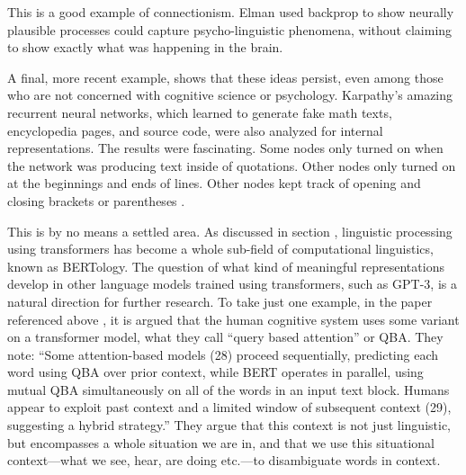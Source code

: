 This is a good example of connectionism. Elman used backprop to show neurally plausible processes could capture psycho-linguistic phenomena, without claiming to show exactly what was happening in the brain.

A final, more recent example, shows that these ideas persist, even among those who are not concerned with cognitive science or psychology. Karpathy's amazing recurrent neural networks, which learned to generate fake math texts, encyclopedia pages, and source code, were also analyzed for internal representations. The results were fascinating. Some nodes only turned on when the network was producing text inside of quotations. Other nodes only turned on at the beginnings and ends of lines. Other nodes kept track of opening and closing brackets or parentheses \cite{karpathy2015visualizing}. 

This is by no means a settled area.  As discussed in section , linguistic processing using transformers has become a whole sub-field of computational linguistics, known as BERTology. The question of what kind of meaningful representations develop in other language models trained using transformers, such as GPT-3, is a natural direction for further research. To take just one example, in the paper referenced above  \cite{mcclelland2020placing}, it is argued that the human cognitive system uses some variant on a transformer model, what they call ``query based attention'' or QBA. They note: ``Some attention-based models (28) proceed sequentially, predicting each word using QBA over prior context, while BERT operates in parallel, using mutual QBA simultaneously on all of the words in an input text block. Humans appear to exploit past context and a limited window of subsequent context (29), suggesting a hybrid strategy.'' They argue that this context is not just linguistic, but encompasses a whole situation we are in, and that we use this situational context---what we see, hear, are doing etc.---to disambiguate words in context. 

